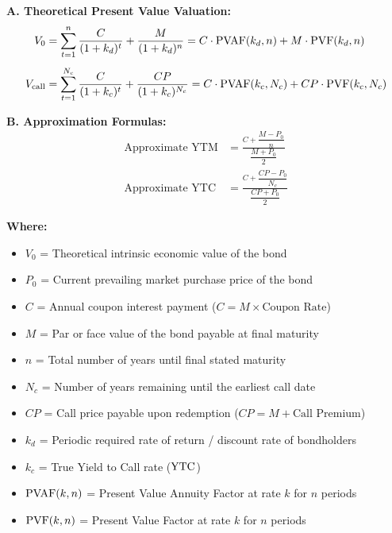 \newpage
\begin{formulabox}
\textbf{A. Theoretical Present Value Valuation:}
\begin{align*}
    V_0 &= \sum_{t=1}^{n} \frac{C}{(1 + k_d)^t} + \frac{M}{(1 + k_d)^n} = C \cdot \operatorname{PVAF}(k_d, n) + M \cdot \operatorname{PVF}(k_d, n) \\[4pt]
    V_{\text{call}} &= \sum_{t=1}^{N_c} \frac{C}{(1 + k_c)^t} + \frac{CP}{(1 + k_c)^{N_c}} = C \cdot \operatorname{PVAF}(k_c, N_c) + CP \cdot \operatorname{PVF}(k_c, N_c)
\end{align*}

\vspace{0.2em}
\textbf{B. Approximation Formulas:}
\begin{align*}
    \text{Approximate YTM} &= \frac{C + \dfrac{M - P_0}{n}}{\dfrac{M + P_0}{2}} \\[6pt]
    \text{Approximate YTC} &= \frac{C + \dfrac{CP - P_0}{N_c}}{\dfrac{CP + P_0}{2}}
\end{align*}

\textbf{Where:}
\begin{itemize}[noitemsep, topsep=2pt]
    \item $V_0$ = Theoretical intrinsic economic value of the bond
    \item $P_0$ = Current prevailing market purchase price of the bond
    \item $C$ = Annual coupon interest payment ($C = M \times \text{Coupon Rate}$)
    \item $M$ = Par or face value of the bond payable at final maturity
    \item $n$ = Total number of years until final stated maturity
    \item $N_c$ = Number of years remaining until the earliest call date
    \item $CP$ = Call price payable upon redemption ($CP = M + \text{Call Premium}$)
    \item $k_d$ = Periodic required rate of return / discount rate of bondholders
    \item $k_c$ = True Yield to Call rate ($\operatorname{YTC}$)
    \item $\operatorname{PVAF}(k, n)$ = Present Value Annuity Factor at rate $k$ for $n$ periods
    \item $\operatorname{PVF}(k, n)$ = Present Value Factor at rate $k$ for $n$ periods
\end{itemize}
\end{formulabox}

